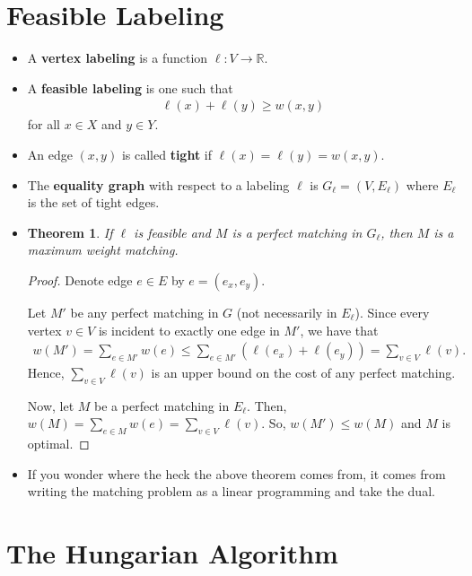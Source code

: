 \documentclass[10pt]{article}
\newtheorem{theorem}[lemma]{Theorem}
\newcommand{\ra}{\rightarrow}
\newcommand{\Real}{\mathbb{R}}
\begin{document}
  \section{Feasible Labeling}
  \begin{itemize}
    \item A {\bf vertex labeling} is a function $\ell: V \ra \Real$.

    \item A {\bf feasible labeling} is one such that
    \begin{align*}
      \ell(x) + \ell(y) \geq w(x,y)
    \end{align*}
    for all $x \in X$ and $y \in Y$.

    \item An edge $(x,y)$ is called {\bf tight} if $\ell(x) = \ell(y) = w(x,y)$.

    \item The {\bf equality graph} with respect to a labeling $\ell$ is $G_\ell = (V, E_\ell)$ where $E_\ell$ is the set of tight edges.

    \item \begin{theorem}
      If $\ell$ is feasible and $M$ is a perfect matching in $G_\ell$, then $M$ is a maximum weight matching.
    \end{theorem}
    \begin{proof}
      Denote edge $e \in E$ by $e = (e_x, e_y)$.

      Let $M'$ be any perfect matching in $G$ (not necessarily in $E_\ell$). Since every vertex $v \in V$ is incident to exactly one edge in $M'$, we have that
      \begin{align*}
        w(M') = \sum_{e \in M'} w(e) \leq \sum_{e \in M'} (\ell(e_x) + \ell(e_y)) = \sum_{v\in V} \ell(v).
      \end{align*}
      Hence, $\sum_{v\in V} \ell(v)$ is an upper bound on the cost of any perfect matching.

      Now, let $M$ be a perfect matching in $E_\ell$. Then, $w(M) = \sum_{e\in M} w(e) = \sum_{v\in V} \ell(v)$. So, $w(M') \leq w(M)$ and $M$ is optimal.
    \end{proof}

    \item If you wonder where the heck the above theorem comes from, it comes from writing the matching problem as a linear programming and take the dual.
  \end{itemize}

  \section{The Hungarian Algorithm}
\end{document}
